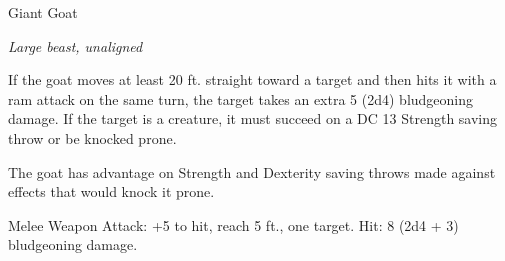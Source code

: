\begin{monsterbox}{Giant Goat}
\begin{hangingpar}
\textit{Large beast, unaligned}
\end{hangingpar}
\dndline%
\basics[%
armorclass = 11,
hitpoints = 3d10 + 3,
speed = {40 ft.}
]
\dndline%
\stats[%
STR = \stat{17},
DEX = \stat{11},
CON = \stat{12},
INT = \stat{3},
WIS = \stat{12},
CHA = \stat{6}
]
\dndline%
\details[%
skills={},
damageimmunities={},
savingthrows={},
conditionimmunities={},
damageresistances={},
damagevulnerabilities={},
senses={passive Perception 11},
challenge=1/2
]
\dndline%
\begin{monsteraction}[Charge]
If the goat moves at least 20 ft. straight toward a target and then hits it with a ram attack on the same turn, the target takes an extra 5 (2d4) bludgeoning damage. If the target is a creature, it must succeed on a DC 13 Strength saving throw or be knocked prone.
\end{monsteraction}
\begin{monsteraction}
The goat has advantage on Strength and Dexterity saving throws made against effects that would knock it prone.
\end{monsteraction}
\begin{monsteraction}[Ram]
Melee Weapon Attack: +5 to hit, reach 5 ft., one target. Hit: 8 (2d4 + 3) bludgeoning damage.
\end{monsteraction}
\end{monsterbox}